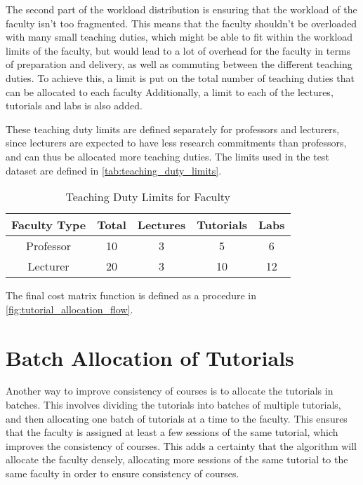 The second part of the workload distribution is ensuring that the workload of the faculty isn't too fragmented. This means that the faculty shouldn't be overloaded with many small teaching duties, which might be able to fit within the workload limits of the faculty, but would lead to a lot of overhead for the faculty in terms of preparation and delivery, as well as commuting between the different teaching duties. To achieve this, a limit is put on the total number of teaching duties that can be allocated to each faculty Additionally, a limit to each of the lectures, tutorials and labs is also added.

These teaching duty limits are defined separately for professors and lecturers, since lecturers are expected to have less research commitments than professors, and can thus be allocated more teaching duties. The limits used in the test dataset are defined in \autoref{tab:teaching_duty_limits}.

\begin{table}[H]
  \centering
  \begin{tabular}{|c|c|c|c|c|}
    \hline
    Faculty Type & Total & Lectures & Tutorials & Labs \\ \hline
    Professor    & 10    & 3        & 5         & 6    \\ \hline
    Lecturer     & 20    & 3        & 10        & 12   \\ \hline
  \end{tabular}
  \caption{Teaching Duty Limits for Faculty}
  \label{tab:teaching_duty_limits}
\end{table}

The final cost matrix function is defined as a procedure in \autoref{fig:tutorial_allocation_flow}.

\section{Batch Allocation of Tutorials}

Another way to improve consistency of courses is to allocate the tutorials in batches. This involves dividing the tutorials into batches of multiple tutorials, and then allocating one batch of tutorials at a time to the faculty. This ensures that the faculty is assigned at least a few sessions of the same tutorial, which improves the consistency of courses. This adds a certainty that the algorithm will allocate the faculty densely, allocating more sessions of the same tutorial to the same faculty in order to ensure consistency of courses.

